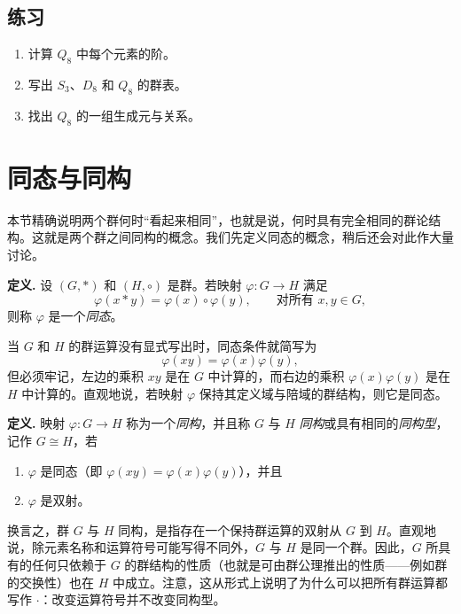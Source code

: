 \subsection*{练习}
\begin{enumerate}[label=\arabic*.]
  \item 计算 $Q_8$ 中每个元素的阶。
  \item 写出 $S_3$、$D_8$ 和 $Q_8$ 的群表。
  \item 找出 $Q_8$ 的一组生成元与关系。
\end{enumerate}


\section{同态与同构}

本节精确说明两个群何时“看起来相同”，也就是说，何时具有完全相同的群论结构。这就是两个群之间同构的概念。我们先定义同态的概念，稍后还会对此作大量讨论。

\noindent\textbf{定义.} 设 $(G,*)$ 和 $(H,\circ)$ 是群。若映射 $\varphi:G\to H$ 满足
\[
  \varphi(x*y)=\varphi(x)\circ\varphi(y),\qquad\text{对所有 }x,y\in G,
\]
则称 $\varphi$ 是一个\emph{同态}。

当 $G$ 和 $H$ 的群运算没有显式写出时，同态条件就简写为
\[
  \varphi(xy)=\varphi(x)\varphi(y),
\]
但必须牢记，左边的乘积 $xy$ 是在 $G$ 中计算的，而右边的乘积 $\varphi(x)\varphi(y)$ 是在 $H$ 中计算的。直观地说，若映射 $\varphi$ 保持其定义域与陪域的群结构，则它是同态。

\noindent\textbf{定义.} 映射 $\varphi:G\to H$ 称为一个\emph{同构}，并且称 $G$ 与 $H$ \emph{同构}或具有相同的\emph{同构型}，记作 $G\cong H$，若
\begin{enumerate}[label=(\arabic*)]
  \item $\varphi$ 是同态（即 $\varphi(xy)=\varphi(x)\varphi(y)$），并且
  \item $\varphi$ 是双射。
\end{enumerate}

换言之，群 $G$ 与 $H$ 同构，是指存在一个保持群运算的双射从 $G$ 到 $H$。直观地说，除元素名称和运算符号可能写得不同外，$G$ 与 $H$ 是同一个群。因此，$G$ 所具有的任何只依赖于 $G$ 的群结构的性质（也就是可由群公理推出的性质——例如群的交换性）也在 $H$ 中成立。注意，这从形式上说明了为什么可以把所有群运算都写作 $\cdot$：改变运算符号并不改变同构型。


